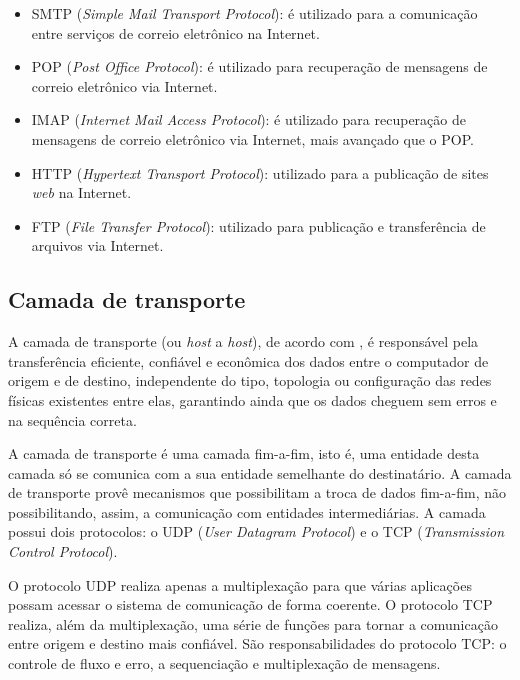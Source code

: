 \begin{itemize}
	\item SMTP (\textit{Simple Mail Transport Protocol}): é utilizado para a 
	comunicação entre serviços de correio eletrônico na Internet.
	\item POP (\textit{Post Office Protocol}): é utilizado para recuperação de 
	mensagens de correio eletrônico via Internet.
	\item IMAP (\textit{Internet Mail Access Protocol}): é utilizado para 
	recuperação de mensagens de correio eletrônico via Internet, mais 
	avançado que o POP.
	\item HTTP (\textit{Hypertext Transport Protocol}): utilizado para a 
	publicação de sites \textit{web} na Internet.
	\item FTP (\textit{File Transfer Protocol}): utilizado para publicação e 
	transferência de arquivos via Internet.

\end{itemize}

\subsection{Camada de transporte}

A camada de transporte (ou \textit{host} a \textit{host}), de acordo com 
, é responsável pela 
transferência eficiente, confiável e econômica dos dados entre o computador de 
origem e de destino, independente do tipo, topologia ou configuração das redes 
físicas existentes entre elas, garantindo ainda que os dados cheguem sem erros 
e na sequência correta.

A camada de transporte é uma camada fim-a-fim, isto é, uma entidade desta 
camada só se comunica com a sua entidade semelhante do destinatário. A camada 
de transporte provê mecanismos que possibilitam a troca de dados fim-a-fim, não 
possibilitando, assim, a comunicação com entidades intermediárias. A camada 
possui dois protocolos: o UDP (\textit{User Datagram Protocol}) e o TCP 
(\textit{Transmission Control Protocol}).

O protocolo UDP realiza apenas a multiplexação para que várias aplicações 
possam acessar o sistema de comunicação de forma coerente. O protocolo TCP 
realiza, além da multiplexação, uma série de funções para 
tornar a comunicação entre origem e destino mais confiável. São 
responsabilidades do protocolo TCP: o controle de fluxo e erro, a 
sequenciação e multiplexação de mensagens.

